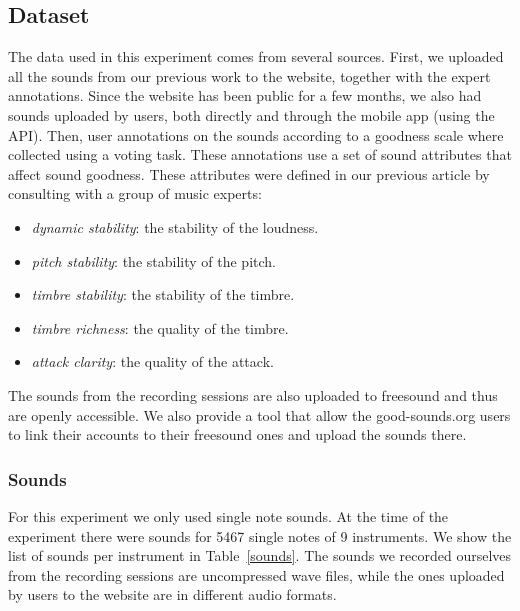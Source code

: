 \documentclass{article}
\begin{document}
\subsection{Dataset}
The data used in this experiment comes from several sources. First, we uploaded all the sounds from our previous work to the website, together with the expert annotations. Since the website has been public for a few months, we also had  sounds uploaded by users, both directly and through the mobile app (using the API). Then, user annotations on the sounds according to a goodness scale where collected using a voting task. These annotations use a set of sound attributes that affect sound goodness. These attributes were defined in our previous article \cite{01} by consulting with a group of music experts:   
\begin{itemize}
	\item{\textit{dynamic stability}: the stability of the loudness.}
	\item{\textit{pitch stability}: the stability of the pitch.}
	\item{\textit{timbre stability}: the stability of the timbre.}
	\item{\textit{timbre richness}: the quality of the timbre.}
	\item{\textit{attack clarity}: the quality of the attack.}
\end{itemize}
The sounds from the recording sessions are also uploaded to freesound and thus are openly accessible. We also provide a tool that allow the good-sounds.org users to link their accounts to their freesound ones and upload the sounds there.  

\subsubsection{Sounds}
For this experiment we only used single note sounds. At the time of the experiment there were sounds for 5467 single notes of 9 instruments. We show the list of sounds per instrument in Table~\ref{sounds}. The sounds we recorded ourselves from the recording sessions are uncompressed wave files, while the ones uploaded by users to the website are in different audio formats.  
\end{document}
